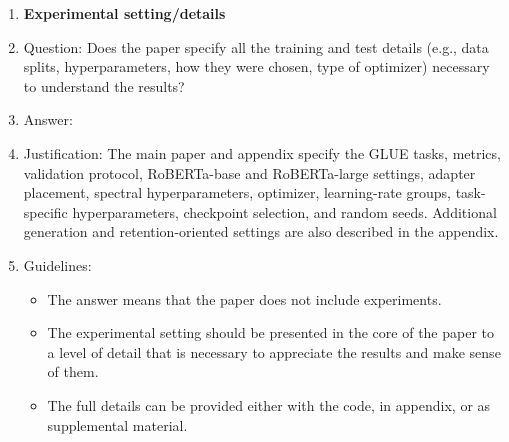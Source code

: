 \begin{enumerate}
\item {\bf Experimental setting/details}
    \item[] Question: Does the paper specify all the training and test details (e.g., data splits, hyperparameters, how they were chosen, type of optimizer) necessary to understand the results?
    \item[] Answer: \answerYes{}
    \item[] Justification: The main paper and appendix specify the GLUE tasks, metrics, validation protocol, RoBERTa-base and RoBERTa-large settings, adapter placement, spectral hyperparameters, optimizer, learning-rate groups, task-specific hyperparameters, checkpoint selection, and random seeds. Additional generation and retention-oriented settings are also described in the appendix.
    \item[] Guidelines:
    \begin{itemize}
        \item The answer \answerNA{} means that the paper does not include experiments.
        \item The experimental setting should be presented in the core of the paper to a level of detail that is necessary to appreciate the results and make sense of them.
        \item The full details can be provided either with the code, in appendix, or as supplemental material.
    \end{itemize}


\end{enumerate}
